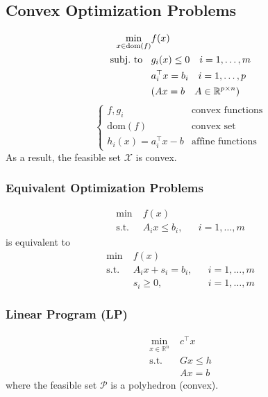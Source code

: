 \subsection{Convex Optimization Problems}
\noindent\begin{align*}
    \min_{x\in\mathrm{dom}(f)} & f(x)                                     \\
    \text{subj.\ to\;\; }      & g_i(x)\leq0\quad i=1,\ldots,m            \\
                               & a_i^{\top} x=b_i \quad i=1,\ldots,p      \\
                               & (Ax =b\quad A\in \mathbb{R}^{p\times n})
\end{align*}
\begin{equation*}
    \begin{cases}
        f,g_i                    & \text{convex functions} \\
        \mathrm{dom}(f)          & \text{convex set}       \\
        h_i(x) = a_i^{\top} x -b & \text{affine functions}
    \end{cases}
\end{equation*}
As a result, the feasible set $\mathcal{X}$ is convex.

\subsubsection{Equivalent Optimization Problems}
\begin{align*}
    \min\;          & f(x)                                \\
    \mathrm{s.t.}\; & A_i x \leq b_i, &  & i = 1,\ldots,m
\end{align*}
is equivalent to
\begin{align*}
    \min\;          & f(x)                                 \\
    \mathrm{s.t.}\; & A_i x +s_i= b_i, &  & i = 1,\ldots,m \\
                    & s_i \geq 0,      &  & i = 1,\ldots,m
\end{align*}

\subsubsection{Linear Program (LP)}
\noindent
\begin{align*}
    \min_{x\in\mathbb{R}^n}\; & c^\top x  \\
    \mathrm{s.t.}\;           & Gx \leq h \\
                              & Ax = b
\end{align*}
where the feasible set $\mathcal{P}$ is a polyhedron (convex).

